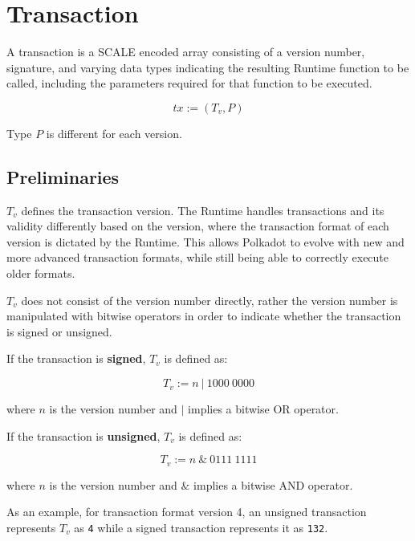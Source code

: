 \newpage
\section{Transaction}

A transaction is a SCALE encoded array consisting of a version number,
signature, and varying data types indicating the resulting Runtime function to
be called, including the parameters required for that function to be executed.
\newline

\[
    tx := (T_v, P)
\]

Type $P$ is different for each version.

\subsection{Preliminaries}

\begin{definition}
    \label{defn-transaction-version}
    $T_v$ defines the transaction version. The Runtime handles transactions and
    its validity differently based on the version, where the transaction format
    of each version is dictated by the Runtime. This allows Polkadot to evolve
    with new and more advanced transaction formats, while still being able to
    correctly execute older formats.
    \newline

    $T_v$ does not consist of the version number directly, rather the version
    number is manipulated with bitwise operators in order to indicate whether
    the transaction is signed or unsigned.
    \newline

    \newline

    If the transaction is \textbf{signed}, $T_v$ is defined as:

    \[
        T_v := n \ | \ 1000 \ 0000
    \]

    where $n$ is the version number and $|$ implies a bitwise OR operator.
    \newline

    If the transaction is \textbf{unsigned}, $T_v$ is defined as:

    \[
        T_v := n \ \& \ 0111 \ 1111
    \]

    where $n$ is the version number and $\&$ implies a bitwise AND operator.
    \newline

    As an example, for transaction format version 4, an unsigned transaction
    represents $T_v$ as \verb|4| while a signed transaction represents it as
    \verb|132|.
\end{definition}

